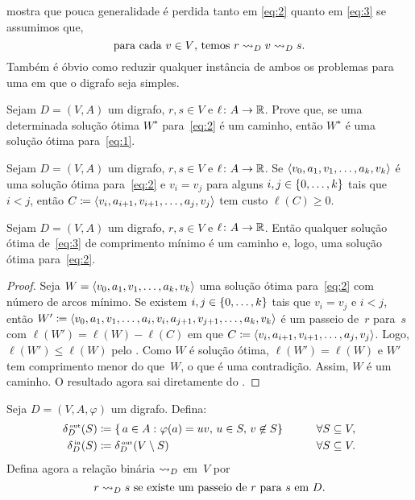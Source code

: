 \documentclass[10pt,reqno]{amsart}
\begin{document}
 mostra que pouca generalidade é perdida tanto em
\eqref{eq:2} quanto em \eqref{eq:3} se assumimos que,
\begin{equation}
  \label{eq:4}
  \text{para cada \(v \in V\), temos \(r \reaches_D v \reaches_D s\).}
\end{equation}
Também é óbvio como reduzir qualquer instância de ambos os problemas para 
uma em que o digrafo seja simples.

\begin{exercise}
  \label{ex:2}
  Sejam \(D = (V,A)\) um digrafo, \(r,s \in V\) e
  \(\ell \colon A \to \mathbb{R}\).  Prove que, se uma determinada solução
  ótima \(W^\star\) para~\eqref{eq:2} é um caminho, então \(W^\star\) é uma
  solução ótima para~\eqref{eq:1}.
\end{exercise}

\begin{exercise}
  \label{ex:3}
  Sejam \(D = (V,A)\) um digrafo, \(r,s \in V\) e
  \(\ell \colon A \to \mathbb{R}\).  Se
  \(\langle v_0,a_1,v_1,\dotsc,a_k,v_k\rangle\) é uma solução ótima
  para~\eqref{eq:2} e \(v_i = v_j\) para alguns
  \(i,j \in \{0,\dotsc,k\}\) tais que \(i < j\), então
  \(C \coloneqq \langle v_i,a_{i+1},v_{i+1},\dotsc,a_j,v_j\rangle\) tem custo
  \(\ell(C) \geq 0\).
\end{exercise}

\begin{proposition}
  \label{prop:1}
  Sejam \(D = (V,A)\) um digrafo, \(r,s \in V\) e
  \(\ell \colon A \to \mathbb{R}\).  Então qualquer solução ótima
  de~\eqref{eq:3} de comprimento mínimo é um caminho e, logo, uma
  solução ótima para~\eqref{eq:2}.
\end{proposition}
\begin{proof}
  Seja \(W = \langle v_0,a_1,v_1,\dotsc,a_k,v_k\rangle\) uma solução ótima
  para~\eqref{eq:2} com número de arcos mínimo.  Se existem
  \(i,j \in \{0,\dotsc,k\}\) tais que \(v_i = v_j\) e \(i < j\),
  então
  \(W' \coloneqq
  \langle v_0,a_1,v_1,\dotsc,a_i,v_i,a_{j+1},v_{j+1},\dotsc,a_k,v_k\rangle\) é
  um passeio de~\(r\) para~\(s\) com \(\ell(W') = \ell(W) - \ell(C)\) em que
  \(C \coloneqq \langle v_i,a_{i+1},v_{i+1},\dotsc,a_j,v_j\rangle\). Logo,
  \(\ell(W') \leq \ell(W)\) pelo .  Como \(W\) é solução ótima,
  \(\ell(W') = \ell(W)\) e \(W'\) tem comprimento menor do que~\(W\), o que
  é uma contradição.  Assim, \(W\) é um caminho.  O resultado agora sai
  diretamente do .
\end{proof}

Seja \(D = (V,A,\varphi)\) um digrafo.  Defina:
\begin{alignat*}{2}
  \label{eq:5}
  \deltaout[D](S)
  & \coloneqq
  \setst{
    a \in A
  }{
    \varphi(a) = uv,\,
    u \in S,\,
    v \not\in S
  }
  & \qquad &
  \forall S \subseteq V,
  \\
  \deltain[D](S)
  & \coloneqq
  \deltaout[D](V \setminus S)
  & \qquad &
  \forall S \subseteq V.
\end{alignat*}
Defina agora a relação binária \(\rightsquigarrow_D\) em~\(V\) por
\begin{equation*}
  r \rightsquigarrow_D s
  \text{ se existe um passeio de~\(r\) para~\(s\) em~\(D\)}.
\end{equation*}
\end{document}
